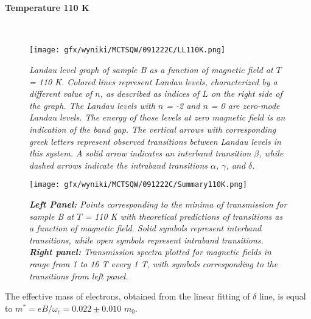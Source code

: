 \documentclass[titlepage,a4paper]{book}
\newcommand{\myparagraph}[1]{\paragraph{#1}\mbox{}\\}
\begin{document}
\clearpage
\myparagraph{Temperature 110 K}
\begin{figure}[ht]
	\centering
	\texttt{[image: gfx/wyniki/MCTSQW/091222C/LL110K.png]}
	\vspace{-10pt}
	\caption{\textit{Landau level graph of sample B as a function of magnetic field at $T$ = 110 K. Colored lines represent Landau levels, characterized by a different value of $n$, as described as indices of $L$ on the right side of the graph. The Landau levels with $n$ = -2 and $n$ = 0 are zero-mode Landau levels. The energy of those levels at zero magnetic field is an indication of the band gap. The vertical arrows with corresponding greek letters represent observed transitions between Landau levels in this system. A solid arrow indicates an interband transition $\beta$, while dashed arrows indicate the intraband transitions $\alpha$, $\gamma$, and $\delta$.}}
	\label{fig:LL_SQW_110K}
\end{figure}
\begin{figure}[ht]
	\centering
	\texttt{[image: gfx/wyniki/MCTSQW/091222C/Summary110K.png]}
	\vspace{-10pt}
	\caption{\textit{\textbf{Left Panel:} Points corresponding to the minima of transmission for sample B at $T$ = 110 K with theoretical predictions of transitions as a function of magnetic field. Solid symbols represent interband transitions, while open symbols represent intraband transitions. \textbf{Right panel:} Transmission spectra plotted for magnetic fields in range from 1 to 16 T every 1 T, with symbols corresponding to the transitions from left panel.}}
	\label{fig:Summary_SQW_110K}
\end{figure}

The effective mass of electrons, obtained from the linear fitting of $\delta$ line, is equal to $m^* = eB/\omega_c = 0.022 \pm 0.010$ $m_0$.
\end{document}
